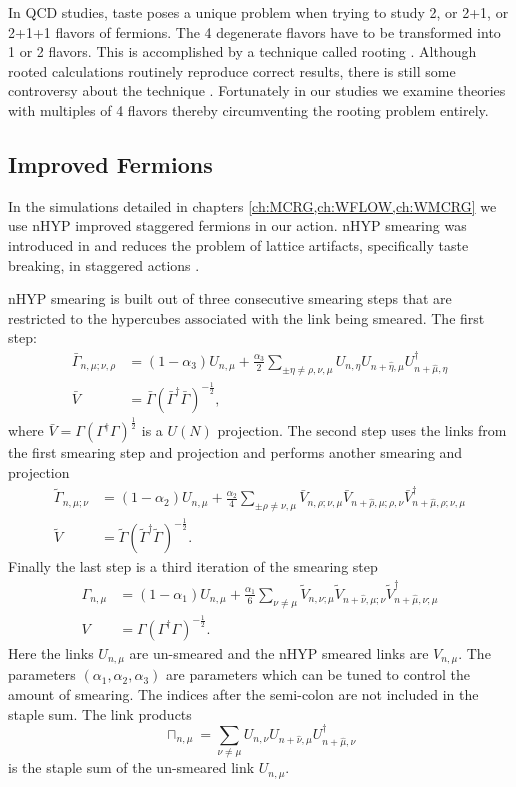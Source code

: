 In QCD studies, taste poses a unique problem when trying to study 2, or 2+1, or 2+1+1 flavors of fermions.
The 4 degenerate flavors have to be transformed into 1 or 2 flavors.
This is accomplished by a technique called rooting \cite{PhysRevD.72.114512}.
Although rooted calculations routinely reproduce correct results, there is still some controversy about the technique \cite{Creutz2007230,Creutz2007241,Kronfeld:2007ek}.
Fortunately in our studies we examine theories with multiples of 4 flavors thereby circumventing the rooting problem entirely.

\subsection{Improved Fermions}

In the simulations detailed in chapters \ref{ch:MCRG,ch:WFLOW,ch:WMCRG} we use nHYP improved staggered fermions in our action.
nHYP smearing was introduced in \cite{Hasenfratz:2007rf} and reduces the problem of lattice artifacts, specifically taste breaking, in staggered actions \cite{Hasenfratz:2001tw}.

nHYP smearing is built out of three consecutive smearing steps that are restricted to the hypercubes associated with the link being smeared.
The first step:
\begin{align}
  \bar{\Gamma}_{n,\mu;\nu,\rho}&=(1-\alpha_3)U_{n,\mu}+\frac{\alpha_3}{2}\sum_{\pm\eta\neq\rho,\nu,\mu}U_{n,\eta}U_{n+\hat{\eta},\mu}U^\dagger_{n+\hat{\mu},\eta} \\
  \bar{V}&=\bar{\Gamma}(\bar{\Gamma}^\dagger\bar{\Gamma})^{-\frac{1}{2}},
\end{align}
where $\bar{V}=\Gamma(\Gamma^\dagger\Gamma)^\frac{1}{2}$ is a $U(N)$ projection.
The second step uses the links from the first smearing step and projection and performs another smearing and projection
\begin{align}
  \widetilde{\Gamma}_{n,\mu;\nu}&=(1-\alpha_2)U_{n,\mu}+\frac{\alpha_2}{4}\sum_{\pm\rho\neq\nu,\mu}\bar{V}_{n,\rho;\nu,\mu}\bar{V}_{n+\hat{\rho},\mu;\rho,\nu}\bar{V}^\dagger_{n+\hat{\mu},\rho;\nu,\mu} \\
  \widetilde{V}&=\widetilde{\Gamma}(\widetilde{\Gamma}^\dagger\widetilde{\Gamma})^{-\frac{1}{2}}.
\end{align}
Finally the last step is a third iteration of the smearing step
\begin{align}
  \Gamma_{n,\mu}&=(1-\alpha_1)U_{n,\mu}+\frac{\alpha_1}{6}\sum_{\nu\neq\mu}\widetilde{V}_{n,\nu;\mu}\widetilde{V}_{n+\hat{\nu},\mu;\nu}\widetilde{V}^\dagger_{n+\hat{\mu},\nu;\mu} \\
  V&=\Gamma(\Gamma^\dagger\Gamma)^{-\frac{1}{2}}.
\end{align}
Here the links $U_{n,\mu}$ are un-smeared and the nHYP smeared links are $V_{n,\mu}$.
The parameters $(\alpha_1,\alpha_2,\alpha_3)$ are parameters which can be tuned to control the amount of smearing.
The indices after the semi-colon are not included in the staple sum.
The link products
\begin{equation}
  \sqcap_{n,\mu}=\sum_{\nu\neq\mu}U_{n,\nu}U_{n+\hat{\nu},\mu}U^\dagger_{n+\hat{\mu},\nu}
\end{equation}
is the staple sum of the un-smeared link $U_{n,\mu}$.
